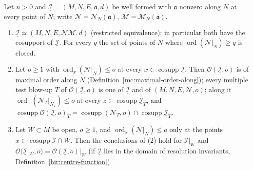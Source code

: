 \begin{lemma}
\label{bcalc:companion-open}
\mixedleanok
Let \(n>0\) and \(\underline{\mathcal I}=(M,N,E,\mathfrak a,d)\) be well formed with \(\mathfrak a\) nonzero along \(N\) at every point of \(N\); write \(\mathcal N=\mathcal N_N(\mathfrak a)\),
\(\mathcal M=\mathcal M_N(\mathfrak a)\).
\begin{enumerate}
\item \(\underline{\mathcal I}\simeq(M,N,E,\mathcal N\mathcal M,d)\) (restricted equivalence); in particular both have the cosupport of \(\underline{\mathcal I}\). For every \(q\) the
set of points of \(N\) where \(\operatorname{ord}(\mathcal N|_N)\ge q\) is closed.
\item Let \(o\ge1\) with \(\operatorname{ord}_x(\mathcal N|_N)\le o\) at every \(x\in\operatorname{cosupp}\underline{\mathcal I}\). Then \(\mathcal O(\underline{\mathcal I},o)\) is of maximal
order along \(N\) (Definition~\ref{mc:maximal-order-along}); every multiple test blow-up \(T\) of \(\mathcal O(\underline{\mathcal I},o)\) is one of \(\underline{\mathcal I}\) and of
\((M,N,E,\mathcal N,o)\); along it \(\operatorname{ord}_z(\mathcal N_T|_{N_T})\le o\) at every \(z\in\operatorname{cosupp}\underline{\mathcal I}_T\), and
\(\operatorname{cosupp}\mathcal O(\underline{\mathcal I},o)_T=\operatorname{cosupp}(\mathcal N_T,o)\cap\operatorname{cosupp}\underline{\mathcal I}_T\).
\item Let \(W\subset M\) be open, \(o\ge1\), and \(\operatorname{ord}_x(\mathcal N|_N)\le o\) only at the points \(x\in\operatorname{cosupp}\underline{\mathcal I}\cap W\). Then the
conclusions of (2) hold for \(\underline{\mathcal I}|_W\) and \(\mathcal O(\underline{\mathcal I}|_W,o)=\mathcal O(\underline{\mathcal I},o)|_W\) (if \(\underline{\mathcal I}\) lies in the
domain of resolution invariants, Definition~\ref{hir:centre-function}).
\end{enumerate}
\end{lemma}
